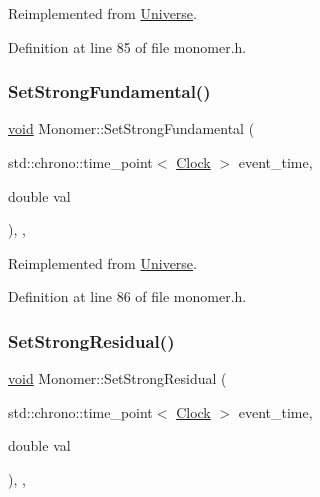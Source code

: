 Reimplemented from \mbox{\hyperlink{class_universe_a5946c8f3d4cda305f3ecd10df21a2f94}{Universe}}.



Definition at line 85 of file monomer.\+h.

\mbox{\label{class_monomer_ad9df06c1a8264bfdb514ef3ba04ef4c7}} 
\subsubsection{\texorpdfstring{Set\+Strong\+Fundamental()}{SetStrongFundamental()}}
{\footnotesize\ttfamily \mbox{\hyperlink{glad_8h_a950fc91edb4504f62f1c577bf4727c29}{void}} Monomer\+::\+Set\+Strong\+Fundamental (\begin{DoxyParamCaption}\item[{std\+::chrono\+::time\+\_\+point$<$ \mbox{\hyperlink{universe_8h_a0ef8d951d1ca5ab3cfaf7ab4c7a6fd80}{Clock}} $>$}]{event\+\_\+time,  }\item[{double}]{val }\end{DoxyParamCaption})\hspace{0.3cm}{\ttfamily [inline]}, {\ttfamily [final]}, {\ttfamily [virtual]}}



Reimplemented from \mbox{\hyperlink{class_universe_aafec97a231126b71c73ac1258609a284}{Universe}}.



Definition at line 86 of file monomer.\+h.

\mbox{\label{class_monomer_ae6ca57913da27fa749d33d1c4fed27ca}} 
\subsubsection{\texorpdfstring{Set\+Strong\+Residual()}{SetStrongResidual()}}
{\footnotesize\ttfamily \mbox{\hyperlink{glad_8h_a950fc91edb4504f62f1c577bf4727c29}{void}} Monomer\+::\+Set\+Strong\+Residual (\begin{DoxyParamCaption}\item[{std\+::chrono\+::time\+\_\+point$<$ \mbox{\hyperlink{universe_8h_a0ef8d951d1ca5ab3cfaf7ab4c7a6fd80}{Clock}} $>$}]{event\+\_\+time,  }\item[{double}]{val }\end{DoxyParamCaption})\hspace{0.3cm}{\ttfamily [inline]}, {\ttfamily [final]}, {\ttfamily [virtual]}}



